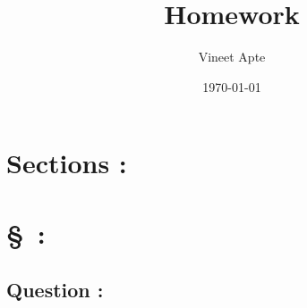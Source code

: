 \documentclass[a4paper]{article}
\title{Homework }
\author{Vineet Apte}
\date{\today}
\begin{document}
\maketitle
\section*{Sections :}
\section*{\S\, :}
\subsection*{Question :}
\end{document}
